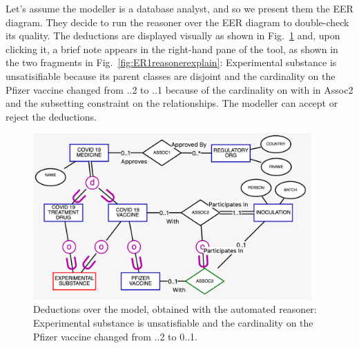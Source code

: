 \documentclass[sn-mathphys]{sn-jnl}
\begin{document}
Let's assume the modeller is a database analyst, and so we present them the EER diagram. They decide to run the reasoner over the EER diagram to double-check its quality. The deductions are displayed visually as shown in Fig.~\ref{fig:ER1reasoner} and, upon clicking it, a brief note appears in the right-hand pane of the tool, as shown in the two fragments in Fig.~\ref{fig:ER1reasonerexplain}:  {\sf Experimental substance} is unsatisifiable because its parent classes are disjoint and the cardinality on the {\sf Pfizer vaccine} changed from {..2} to {..1} because of the cardinality on {\sf with} in {\sf Assoc2} and the subsetting constraint on the relationships. The modeller can accept or reject the deductions.


\begin{figure}[h]
  \centering
      \includegraphics[width=0.95\textwidth]{covidER1reasoneroutput.pdf} 
    \caption{Deductions over the model, obtained with the automated reasoner: {\sf Experimental substance} is unsatisfiable and the cardinality on the {\sf Pfizer vaccine} changed from {..2} to {0..1}.}
    \label{fig:ER1reasoner}
\end{figure}
\end{document}
